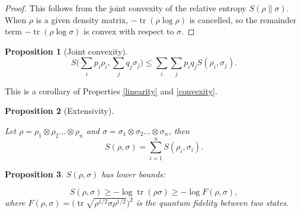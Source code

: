 \documentclass[11pt]{article}
\newtheorem{proposition}{Proposition}
\theoremstyle{definition}
\DeclareMathOperator{\tr}{\text{tr}}
\begin{document}
\begin{proof}
This follows from the joint convexity of the relative entropy $S(\rho \| \sigma)$. When $\rho$ is a given density matrix, $-\tr(\rho \log \rho)$ is cancelled, so the remainder term $-\tr(\rho \log \sigma)$ is convex with respect to $\sigma$.
\end{proof} 

\begin{proposition}[Joint convexity]
\begin{equation}
    S \Big(\sum_i p_i \rho_i, \sum_j q_j \sigma_j \Big)
    \leq \sum_i \sum_j p_i q_j S(\rho_i, \sigma_j).
\end{equation}
\end{proposition}


This is a corollary of Properties \ref{linearity} and \ref{convexity}.



\begin{proposition}[Extensivity]\label{extensivity}

Let $\rho=\rho_1\otimes\rho_2...\otimes\rho_n$ and $\sigma=\sigma_1\otimes \sigma_2...\otimes\sigma_n$, then
\begin{equation}
S(\rho,\sigma)=\sum_{i=1}^nS(\rho_i,\sigma_i).
\end{equation}
    
\end{proposition}



\begin{proposition}\label{crossentropybound}
 $S(\rho, \sigma)$ has lower bounds:

\begin{equation}\label{cross entropy-fidelity}
    S(\rho, \sigma) \geq -\log \tr (\rho \sigma)\geq -\log F(\rho,\sigma),
\end{equation}
where $F(\rho,\sigma)= \big(\tr \sqrt{\rho^{1/2}\sigma\rho^{1/2}} \big)^2$ is the quantum fidelity between two states.
\end{proposition}
\end{document}
